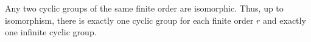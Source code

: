 Any two cyclic groups of the same finite order are isomorphic. Thus, up to isomorphism, there is exactly one cyclic group for each finite order $r$ and exactly one infinite cyclic group.
